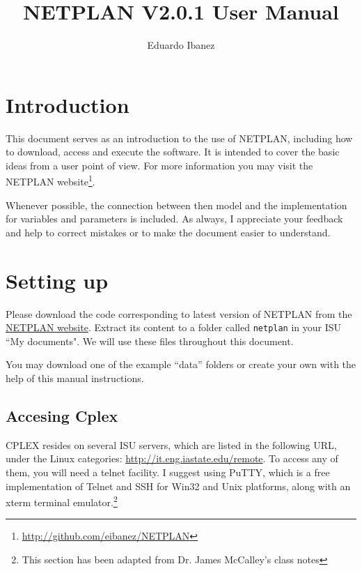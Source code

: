 \documentclass{article}
\title{NETPLAN V2.0.1 User Manual}
\author{Eduardo Ibanez}
\begin{document}
\maketitle
\tableofcontents


\section{Introduction}

This document serves as an introduction to the use of NETPLAN, including how to download, access and execute the software. It is intended to cover the basic ideas from a user point of view. For more information you may visit the NETPLAN website\footnote{\url{http://github.com/eibanez/NETPLAN}}.

Whenever possible, the connection between then model and the implementation for variables and parameters is included. As always, I appreciate your feedback and help to correct mistakes or to make the document easier to understand.


\section{Setting up}

Please download the code corresponding to latest version of NETPLAN from the \href{http://github.com/eibanez/NETPLAN}{NETPLAN website}. Extract its content to a folder called \verb=netplan= in your ISU ``My documents". We will use these files throughout this document.

You may download one of the example ``data'' folders or create your own with the help of this manual instructions.


\subsection{Accesing Cplex}

CPLEX resides on several ISU servers, which are listed in the following URL, under the Linux categories: \url{http://it.eng.iastate.edu/remote}. To access any of them, you will need a telnet facility. I suggest using PuTTY, which is a free implementation of Telnet and SSH for Win32 and Unix platforms, along with an xterm terminal emulator.\footnote{This section has been adapted from Dr. James McCalley's class notes}
\end{document}
